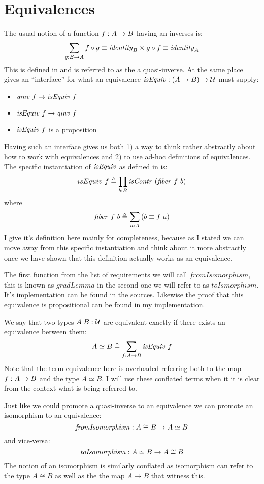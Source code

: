 \section{Equivalences}
\label{sec:equiv}
The usual notion of a function $f \mathrel{:} A \to B$ having an inverses is:
%
$$
\sum_{g \mathrel{:} B \to A} f \circ g \equiv \mathit{identity}_{B} \times g \circ f \equiv \mathit{identity}_{A}
$$
%
This is defined in \cite[p. 129]{hott-2013} and is referred to as the a
quasi-inverse. At the same place \cite{hott-2013} gives an ``interface'' for
what an equivalence $\mathit{isEquiv} \mathrel{:} (A \to B) \to \mathcal{U}$ must supply:
%
\begin{itemize}
\item
  $\qinv\ f \to \isEquiv\ f$
\item
  $\isEquiv\ f \to \qinv\ f$
\item
  $\mathit{isEquiv}\ f$ is a proposition
\end{itemize}
%
Having such an interface gives us both 1) a way to think rather abstractly about
how to work with equivalences and 2) to use ad-hoc definitions of equivalences.
The specific instantiation of $\mathit{isEquiv}$ as defined in \cite{cubical-agda} is:
%
$$
isEquiv\ f \defeq \prod_{b \tp B} \isContr\ (\fiber\ f\ b)
$$
where
$$
\mathit{fiber}\ f\ b \mathrel{\triangleq} \sum_{a \mathrel{:} A} \left( b \equiv f\ a \right)
$$
%
I give it's definition here mainly for completeness, because as I stated we can
move away from this specific instantiation and think about it more abstractly
once we have shown that this definition actually works as an equivalence.

The first function from the list of requirements we will call
$\mathit{fromIsomorphism}$, this is known as $\mathit{gradLemma}$ in
\cite{cubical-agda} the second one we will refer to as $\mathit{toIsmorphism}$. It's
implementation can be found in the sources. Likewise the proof that this
equivalence is propositional can be found in my implementation.

We say that two types $A\;B \mathrel{:} \mathcal{U}$ are equivalent exactly if there exists an
equivalence between them:
%
$$
A \simeq B \mathrel{\triangleq} \sum_{f \mathrel{:} A \to B} \mathit{isEquiv}\ f
$$
%
Note that the term equivalence here is overloaded referring both to the map $f
\mathrel{:} A \to B$ and the type $A \simeq B$. I will use these conflated terms when it
it is clear from the context what is being referred to.

Just like we could promote a quasi-inverse to an equivalence we can promote an
isomorphism to an equivalence:
%
$$
\mathit{fromIsomorphism} \mathrel{:} A \cong B \to A \simeq B
$$
%
and vice-versa:
%
$$
\mathit{toIsomorphism} \mathrel{:} A \simeq B \to A \cong B
$$
%
The notion of an isomorphism is similarly conflated as isomorphism can refer to
the type $A \cong B$ as well as the the map $A \to B$ that witness this.

